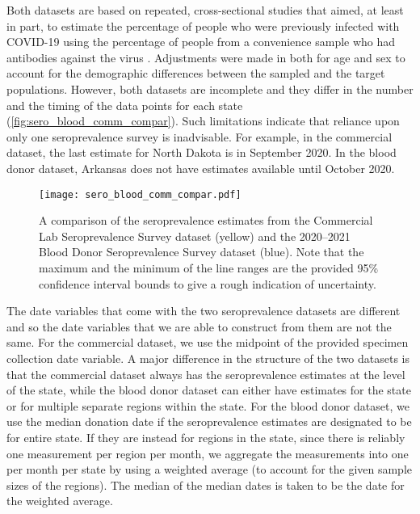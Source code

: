 Both datasets are based on repeated, cross-sectional studies that aimed, at
least in part, to estimate the percentage of people who were previously infected
with COVID-19 using the percentage of people from a convenience sample who had
antibodies against the virus \citep{bajema2021estimated, cdc2020data,
jones2021estimated}. Adjustments were made in both for age and sex to account
for the demographic differences between the sampled and the target populations.
However, both datasets are incomplete and they differ in the number and the
timing of the data points for each state (\autoref{fig:sero_blood_comm_compar}).
Such limitations indicate that reliance upon only one seroprevalence survey is
inadvisable. For example, in the commercial dataset, the last estimate for North
Dakota is in September 2020. In the blood donor dataset, Arkansas does not have
estimates available until October 2020. 

\begin{figure}[!tb]
\centering
    \texttt{[image: sero\_blood\_comm\_compar.pdf]}
    \caption{A comparison of the seroprevalence estimates from the Commercial
    Lab Seroprevalence Survey dataset (yellow) and the 2020--2021 Blood Donor 
    Seroprevalence Survey dataset (blue). Note that the maximum and the minimum
    of the line ranges are the provided 95\% confidence interval bounds to 
    give a rough indication of uncertainty.}
    \label{fig:sero_blood_comm_compar}
\end{figure}
    
The date variables that come with the two seroprevalence datasets are different
and so the date variables that we are able to construct from them are not the
same. For the commercial dataset, we use the midpoint of the provided specimen
collection date variable. A major difference in the structure of the two
datasets is that the commercial dataset always has the seroprevalence estimates
at the level of the state, while the blood donor dataset can either have
estimates for the state or for multiple separate regions within the state. For
the blood donor dataset, we use the median donation date if the seroprevalence
estimates are designated to be for entire state. If they are instead for regions
in the state, since there is reliably one measurement per region per month, we
aggregate the measurements into one per month per state by using a weighted
average (to account for the given sample sizes of the regions). The median of
the median dates is taken to be the date for the weighted average.

